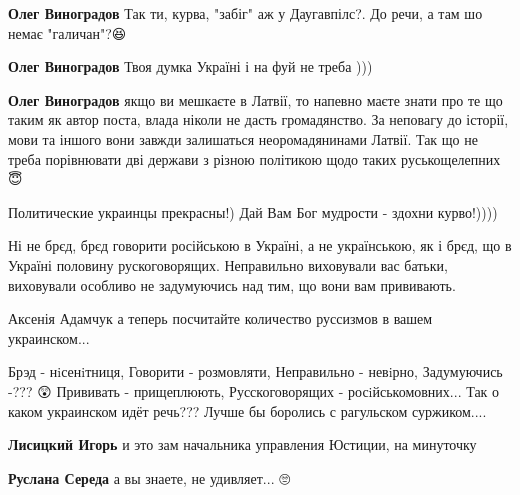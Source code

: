 \begin{itemize}
\begin{itemize}

\textbf{Олег Виноградов} Так ти, курва, "забіг" аж у Даугавпілс?. До речи, а там шо немає "галичан"?😆

\textbf{Олег Виноградов} Твоя думка Україні і на фуй не треба )))

\textbf{Олег Виноградов} якщо ви мешкаєте в Латвії, то напевно маєте знати про
те що таким як автор поста, влада ніколи не дасть громадянство. За неповагу до
історії, мови та іншого вони завжди залишаться неоромадянинами Латвії. Так що
не треба порівнювати дві держави з різною політикою щодо таких руськощелепних😇

Политические украинцы прекрасны!) Дай Вам Бог мудрости - здохни курво!))))
\end{itemize}


Ні не брєд, брєд говорити російською в Україні, а не українською, як і брєд, що
в Україні половину рускоговорящих. Неправильно виховували вас батьки,
виховували особливо не задумуючись над тим, що вони вам прививають.

\begin{itemize}
Аксенія Адамчук а теперь посчитайте количество руссизмов в вашем украинском...
🤔

Брэд - нiсенiтниця,
Говорити - розмовляти,
Неправильно - невiрно,
Задумуючись -??? 😲
Прививать - прищеплюють,
Русскоговорящих - росiйськомовних...
Так о каком украинском идёт речь???
Лучше бы боролись с рагульском суржиком....
🤔


\textbf{Лисицкий Игорь} и это зам начальника управления Юстиции, на минуточку

\textbf{Руслана Середа} а вы знаете, не удивляет...
🙄


\end{itemize}
\end{itemize}
